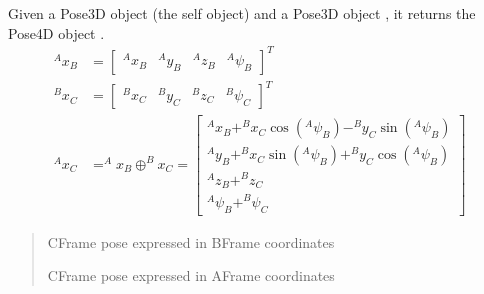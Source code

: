 \documentclass[letterpaper,10pt,english]{sphinxmanual}
\begin{document}
\begin{fulllineitems}
\begin{fulllineitems}
\label{\detokenize{Pose:Pose.Pose4D.oplus}}
\pysigstartsignatures
{}
\pysigstopsignatures
\sphinxAtStartPar
Given a Pose3D object  (the self object) and a Pose3D object , it returns the Pose4D object .
\begin{equation}\label{equation:Pose:eq-oplus4dof}
\begin{split}^Ax_B &= \begin{bmatrix} ^Ax_B & ^Ay_B & ^Az_B & ^A\psi_B \end{bmatrix}^T \\
^Bx_C &= \begin{bmatrix} ^Bx_C & ^By_C & ^Bz_C & ^B\psi_C \end{bmatrix}^T \\
^Ax_C &= ^Ax_B \oplus ^Bx_C =
\begin{bmatrix}
    ^Ax_B + ^Bx_C  \cos(^A\psi_B) - ^By_C  \sin(^A\psi_B) \\
    ^Ay_B + ^Bx_C  \sin(^A\psi_B) + ^By_C  \cos(^A\psi_B) \\
    ^Az_B + ^Bz_C \\
    ^A\psi_B + ^B\psi_C
\end{bmatrix}\end{split}
\end{equation}\begin{quote}\begin{description}
\sphinxAtStartPar
{} \textendash{} C\sphinxhyphen{}Frame pose expressed in B\sphinxhyphen{}Frame coordinates

\sphinxAtStartPar
C\sphinxhyphen{}Frame pose expressed in A\sphinxhyphen{}Frame coordinates

\end{description}\end{quote}

\end{fulllineitems}



\end{fulllineitems}
\end{document}
